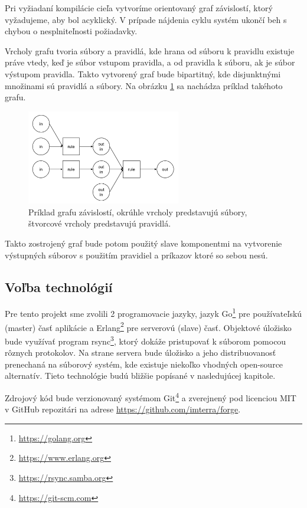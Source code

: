 Pri vyžiadaní kompilácie cieľa vytvoríme orientovaný graf závislostí, ktorý vyžadujeme,
aby bol acyklický. V prípade nájdenia cyklu systém ukončí beh s chybou o nesplniteľnosti
požiadavky.

Vrcholy grafu tvoria súbory a pravidlá, kde hrana od súboru k pravidlu existuje
práve vtedy, keď je súbor vstupom pravidla, a od pravidla k súboru, ak je súbor
výstupom pravidla. Takto vytvorený graf bude bipartitný, kde disjunktnými množinami
sú pravidlá a súbory. Na obrázku \ref{img:dependency_graph} sa nachádza príklad
takéhoto grafu.

\begin{figure}[h]
  \centerline{\includegraphics[width=0.6\textwidth]{images/dependency_graph}}
  \caption[Graf závislostí]{Príklad grafu závislostí, okrúhle vrcholy predstavujú
  súbory, štvorcové vrcholy predstavujú pravidlá.}
  \label{img:dependency_graph}
\end{figure}

Takto zostrojený graf bude potom použitý slave komponentmi na vytvorenie výstupných
súborov s použitím pravidiel a príkazov ktoré so sebou nesú.

\newpage

\subsection{Vo\v{l}ba technol\'{o}gi\'{i}}
\label{sub:solution:tech}

Pre tento projekt sme zvolili 2 programovacie jazyky, jazyk Go\footnote{\url{https://golang.org}}
pre používateľskú (master) časť aplikácie a Erlang\footnote{\url{https://www.erlang.org}}
pre serverovú (slave) časť. Objektové úložisko bude využívať program rsync\footnote{\url{https://rsync.samba.org}},
ktorý dokáže pristupovať k súborom pomocou rôznych protokolov. Na strane servera bude úložisko
a jeho distribuovanosť prenechaná na súborový systém, kde existuje niekoľko vhodných
open-source alternatív. Tieto technológie budú bližšie popísané v nasledujúcej kapitole.

Zdrojový kód bude verzionovaný systémom Git\footnote{\url{https://git-scm.com}} a
zverejnený pod licenciou MIT v GitHub repozitári na adrese \url{https://github.com/imterra/forge}.
